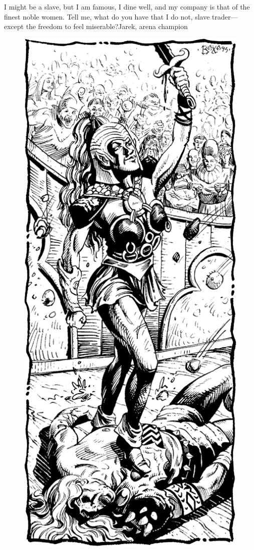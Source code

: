 {I might be a slave, but I am famous, I dine well, and my company is that of the finest noble women. Tell me, what do you have that I do not, slave trader---except the freedom to feel miserable?}{Jarek, arena champion}

\begin{figure}[t!]
\centering
\includegraphics[width=\columnwidth]{images/gladiator-2.png}
\WOTC
\end{figure}

